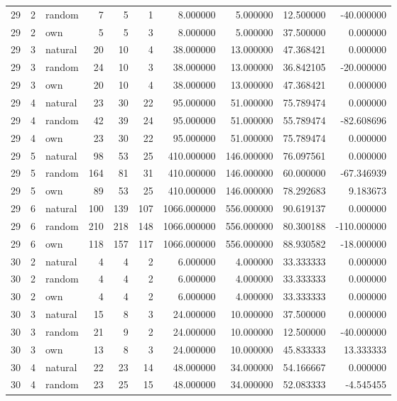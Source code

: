 \begin{table}[htbp]
\begin{tabular}{rrlrrrrrrr}
29 & 2 & random & 7 & 5 & 1 & 8.000000 & 5.000000 & 12.500000 & -40.000000 \\
29 & 2 & own & 5 & 5 & 3 & 8.000000 & 5.000000 & 37.500000 & 0.000000 \\
29 & 3 & natural & 20 & 10 & 4 & 38.000000 & 13.000000 & 47.368421 & 0.000000 \\
29 & 3 & random & 24 & 10 & 3 & 38.000000 & 13.000000 & 36.842105 & -20.000000 \\
29 & 3 & own & 20 & 10 & 4 & 38.000000 & 13.000000 & 47.368421 & 0.000000 \\
29 & 4 & natural & 23 & 30 & 22 & 95.000000 & 51.000000 & 75.789474 & 0.000000 \\
29 & 4 & random & 42 & 39 & 24 & 95.000000 & 51.000000 & 55.789474 & -82.608696 \\
29 & 4 & own & 23 & 30 & 22 & 95.000000 & 51.000000 & 75.789474 & 0.000000 \\
29 & 5 & natural & 98 & 53 & 25 & 410.000000 & 146.000000 & 76.097561 & 0.000000 \\
29 & 5 & random & 164 & 81 & 31 & 410.000000 & 146.000000 & 60.000000 & -67.346939 \\
29 & 5 & own & 89 & 53 & 25 & 410.000000 & 146.000000 & 78.292683 & 9.183673 \\
29 & 6 & natural & 100 & 139 & 107 & 1066.000000 & 556.000000 & 90.619137 & 0.000000 \\
29 & 6 & random & 210 & 218 & 148 & 1066.000000 & 556.000000 & 80.300188 & -110.000000 \\
29 & 6 & own & 118 & 157 & 117 & 1066.000000 & 556.000000 & 88.930582 & -18.000000 \\
30 & 2 & natural & 4 & 4 & 2 & 6.000000 & 4.000000 & 33.333333 & 0.000000 \\
30 & 2 & random & 4 & 4 & 2 & 6.000000 & 4.000000 & 33.333333 & 0.000000 \\
30 & 2 & own & 4 & 4 & 2 & 6.000000 & 4.000000 & 33.333333 & 0.000000 \\
30 & 3 & natural & 15 & 8 & 3 & 24.000000 & 10.000000 & 37.500000 & 0.000000 \\
30 & 3 & random & 21 & 9 & 2 & 24.000000 & 10.000000 & 12.500000 & -40.000000 \\
30 & 3 & own & 13 & 8 & 3 & 24.000000 & 10.000000 & 45.833333 & 13.333333 \\
30 & 4 & natural & 22 & 23 & 14 & 48.000000 & 34.000000 & 54.166667 & 0.000000 \\
30 & 4 & random & 23 & 25 & 15 & 48.000000 & 34.000000 & 52.083333 & -4.545455 \\

\end{tabular}
\end{table}
